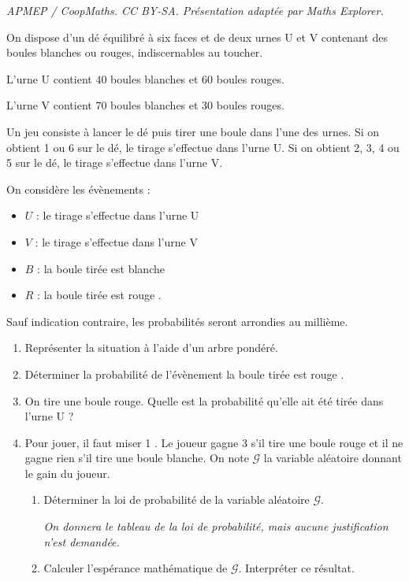 \documentclass[10pt]{article}
\providecommand{\euro}{\texteuro}
\providecommand{\euro}{{\text{€}}}
\renewcommand{\euro}{\ifmmode\text{\texteuro}\else\texteuro\fi}
\begin{document}
\noindent\textit{APMEP / CoopMaths. CC BY-SA. Présentation adaptée par Maths Explorer.}\par\medskip
\medskip

On dispose d'un dé équilibré à six faces et de deux urnes U et V contenant des boules blanches ou rouges, indiscernables au toucher.

L'urne U contient $40$ boules blanches et $60$ boules rouges.

L'urne V contient $70$ boules blanches et $30$ boules rouges.

Un jeu consiste à lancer le dé puis tirer une boule dans l'une des urnes. Si on obtient 1 ou 6 sur le dé, le tirage s'effectue dans l'urne U. Si on obtient 2, 3, 4 ou 5 sur le dé, le tirage s'effectue dans l'urne V.

On considère les évènements :
\begin{itemize}
\item $U$ : \og le tirage s'effectue dans l'urne U \fg
\item $V$ : \og le tirage s'effectue dans l'urne V \fg
\item $B$ : \og la boule tirée est blanche \fg
\item $R$ : \og la boule tirée est rouge \fg.
\end{itemize}

Sauf indication contraire, les probabilités seront arrondies au millième.

\medskip

\begin{enumerate}
\item Représenter la situation à l'aide d'un arbre pondéré.
\item Déterminer la probabilité de l'évènement \og la boule tirée est rouge \fg.
\item On tire une boule rouge. Quelle est la probabilité qu'elle ait été tirée dans l'urne U ?
\item Pour jouer, il faut miser 1 \euro. Le joueur gagne 3 \euro{} s'il tire une boule rouge et il ne gagne rien s'il tire une boule blanche. On note $\mathcal{G}$  la variable aléatoire donnant le gain du joueur.
	\begin{enumerate}
		\item Déterminer la loi de probabilité de la variable aléatoire $\mathcal{G}$.

\emph{On donnera le tableau de la loi de probabilité, mais aucune justification n'est demandée.}
		\item Calculer l'espérance mathématique de $\mathcal{G}$. Interpréter ce résultat.
	\end{enumerate}
\end{enumerate}
\end{document}
